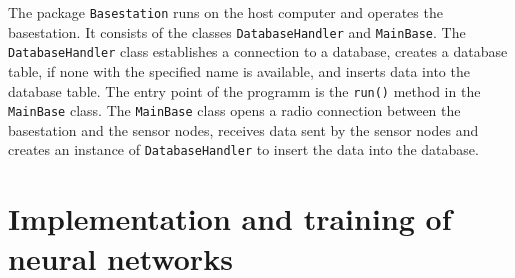 \documentclass[12pt,a4paper]{scrartcl}
\begin{document}
	The package \texttt{Basestation} runs on the host computer and operates the basestation.
	It consists of the classes \texttt{Database\-Handler} and \texttt{MainBase}.
	The \texttt{Database\-Handler} class establishes a connection to a database, creates a database table, if none with the specified name is available, and inserts data into the database table.
	The entry point of the programm is the \texttt{run()} method in the \texttt{MainBase} class. The \texttt{MainBase} class opens a radio connection between the basestation and the sensor nodes, receives data sent by the sensor nodes and creates an instance of \texttt{Database\-Handler} to insert the data into the database.
	
	
	
	
	\newpage
	
	
	\section*{Implementation and training of neural networks}
	
\end{document}
